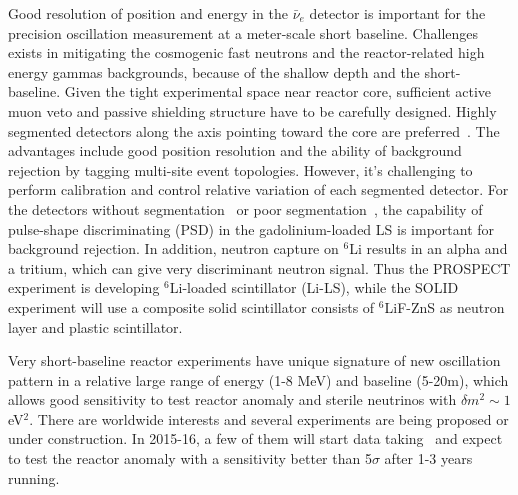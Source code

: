 Good resolution of position and energy in the $\bar\nu_e$ detector is important for the precision oscillation measurement at a meter-scale short baseline. Challenges exists in mitigating the cosmogenic fast neutrons and the reactor-related high energy gammas backgrounds, because of the shallow depth and the short-baseline. Given the tight experimental space near reactor core, sufficient active muon veto and passive shielding structure have to be carefully designed. Highly segmented detectors along the axis pointing toward the core are preferred~\cite{PROSPECT,DANSS,SoLid,HANARO}. The advantages include good position resolution and the ability of background rejection by tagging multi-site event topologies. However, it's challenging to perform calibration and control relative variation of each segmented detector. For the detectors without segmentation~\cite{NUCIFER-2010,NEUTRINO4-2014,POSEIDON} or poor segmentation~\cite{NUCIFER-2014}, the capability of pulse-shape discriminating (PSD) in the gadolinium-loaded LS is important for background rejection. In addition, neutron capture on $^6$Li results in an alpha and a tritium, which can give very discriminant neutron signal. Thus the PROSPECT experiment is developing $^6$Li-loaded scintillator (Li-LS), while the SOLID experiment will use a composite solid scintillator consists of $^6$LiF-ZnS as neutron layer and plastic scintillator.

Very short-baseline reactor experiments have unique signature of new oscillation pattern in a relative large range of energy (1-8 MeV) and baseline (5-20m), which allows good sensitivity to test reactor anomaly and sterile neutrinos with $\delta m^2\sim1$eV$^2$. There are worldwide interests and several experiments are being proposed or under construction. In 2015-16, a few of them will start data taking~\cite{Lhuillier-Neutrino14} and expect to test the reactor anomaly with a sensitivity better than 5$\sigma$ after 1-3 years running.


